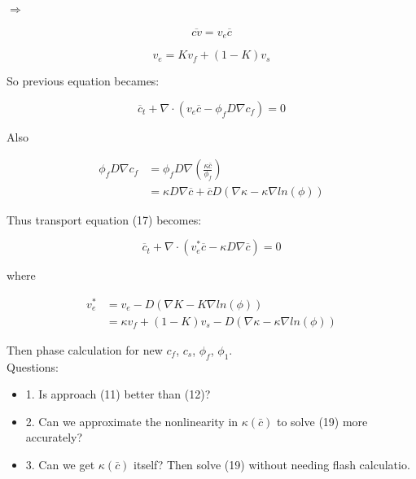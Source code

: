 $\Rightarrow$

\begin{equation}
		  \overline{cv} = v_e \overline{c}
\end{equation}

\begin{equation}
		  v_e = Kv_f + (1-K)v_s
\end{equation}

So previous equation becames:

\begin{equation}
		  \overline{c}_t + \nabla \cdot (v_e \overline{c} - \phi_f D \nabla c_f) = 0
\end{equation}

Also

\begin{equation}
		  \begin{aligned}
		  \phi_f D \nabla c_f &= \phi_f D \nabla (\frac{\kappa \overline{c}}{\phi_f})\\
		  &= \kappa D \nabla \overline{c} + \overline{c}D(\nabla \kappa - \kappa \nabla ln(\phi))
		  \end{aligned}
\end{equation}

Thus transport equation (17) becomes:

\begin{equation}
		  \overline{c}_t + \nabla \cdot (v_e^* \overline{c} - \kappa D \nabla \overline{c}) = 0
\end{equation}

where

\begin{equation}
		  \begin{aligned}
					 v_e^* &= v_e - D (\nabla K - K \nabla ln(\phi))\\
					 &= \kappa v_f + (1-K)v_s - D(\nabla \kappa - \kappa \nabla ln(\phi))
		  \end{aligned}
\end{equation}

Then phase calculation for new $c_f$, $c_s$, $\phi_f$, $\phi_1$.\\

Questions:

\begin{itemize}
		  \item 1. Is approach (11) better than (12)?
		  \item 2. Can we approximate the nonlinearity in $\kappa(\bar{c})$ to solve (19) more accurately?
		  \item 3. Can we get $\kappa(\bar{c})$ itself? Then solve (19) without needing flash calculatio.
\end{itemize}

